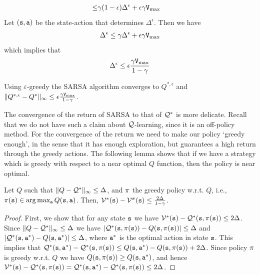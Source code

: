\begin{advanced}
\begin{align*}
  \leq & 
   \gamma(1-\epsilon) \Delta^\epsilon+\epsilon\gamma {\tt V}_{\max }
\end{align*}
Let $({\tt s},{\tt a})$ be the state-action that determines $\Delta^\epsilon$. Then we have
\[
\Delta^\epsilon \leq   \gamma \Delta^\epsilon+\epsilon\gamma {\tt V}_{\max }
\]
which implies that 
\[
\Delta^\epsilon \leq \epsilon \frac{\gamma{\tt V}_{\max }}{1-\gamma}
\]
\begin{theorem}
Using $\varepsilon$-greedy the SARSA algorithm converges to     $Q^{*,\epsilon}$ and $\|Q^{*,\epsilon} -Q^{*}\|_\infty\leq \epsilon \frac{\gamma{\tt V}_{\max }}{1-\gamma}$.
\end{theorem}


The convergence of the return of SARSA to that of $\mathcal{Q}^*$ is more
delicate. Recall that we do not have such a claim about
$\mathcal{Q}$-learning, since it is an off-policy method. For the convergence
of the return we need to make our policy `greedy enough', in the
sense that it has enough exploration, but guarantees a high return
through the greedy actions. The following lemma shows that if we
have a strategy which is greedy with respect to a near optimal $Q$
function, then the policy is near optimal.

\begin{lemma}
\label{lemma:Q-greedy-policy}
%
Let $Q$ such that $\| Q-\mathcal{Q}^*\|_\infty \leq \Delta$, and $\pi$ the
greedy policy w.r.t. $Q$, i.e., $\pi({\tt s})\in \arg\max_{\tt a}
Q({\tt s},{\tt a})$. Then,
$\mathcal{V}^*({\tt s})-\mathcal{V}^\pi({\tt s})\leq
\frac{2\Delta}{1-\gamma}$.
\end{lemma}
\begin{proof}
First, we show that for any state ${\tt s}$ we have
$\mathcal{V}^*({\tt s})-\mathcal{Q}^*({\tt s},\pi({\tt s}))\leq 2\Delta$. Since
$\| Q-\mathcal{Q}^*\|_\infty \leq \Delta$ we have
$|\mathcal{Q}^*({\tt s},\pi({\tt s}))-Q({\tt s},\pi({\tt s}))|\leq \Delta$
and $|\mathcal{Q}^*({\tt s},{\tt a}^*)-Q({\tt s},{\tt a}^*)|\leq \Delta$, where
${\tt a}^*$ is the optimal action in state ${\tt s}$. This implies that
%
$\mathcal{Q}^*({\tt s},{\tt a}^*)-\mathcal{Q}^*({\tt s},\pi({\tt s}))\leq
Q({\tt s},{\tt a}^*)-Q({\tt s},\pi({\tt s}))+2\Delta$.
%
Since policy $\pi$ is greedy w.r.t. $Q$ we have
$Q({\tt s},\pi({\tt s}))\geq Q({\tt s},{\tt a}^*)$, and hence
$\mathcal{V}^*({\tt s})-\mathcal{Q}^*({\tt s},\pi({\tt s}))=\mathcal{Q}^*({\tt s},{\tt a}^*)-\mathcal{Q}^*({\tt s},\pi({\tt s}))\leq
2\Delta$.



\end{proof}
\end{advanced}
